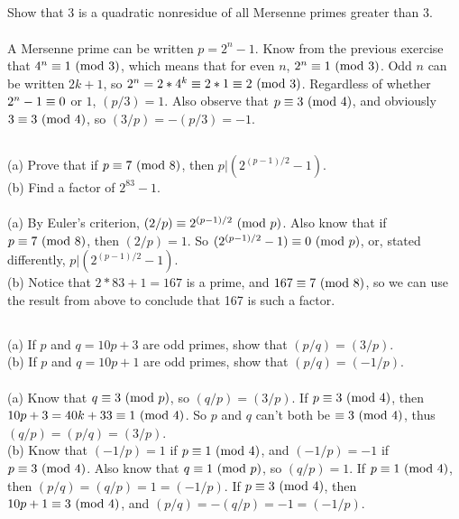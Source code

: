 \documentclass{article} \usepackage{amsmath}
\begin{document}
\subsection{}
Show that 3 is a quadratic nonresidue of all Mersenne primes greater than 3.\\~\\
A Mersenne prime can be written $p = 2^n - 1$.
Know from the previous exercise that $4^n \equiv 1 \ (\mathrm{mod}\ 3)$, which means that
for even $n$, $2^n \equiv 1 \ (\mathrm{mod}\ 3)$.
Odd $n$ can be written $2k + 1$, so $2^n = 2*4^k \equiv 2*1 \equiv 2 \ (\mathrm{mod}\ 3)$.
Regardless of whether $2^n - 1 \equiv 0$ or $1$, $(p/3) = 1$.
Also observe that $p \equiv 3 \ (\mathrm{mod}\ 4)$, and obviously $3 \equiv 3 \ (\mathrm{mod}\ 4)$,
so $(3/p) = -(p/3) = -1$.

\subsection{}
(a) Prove that if $p \equiv 7 \ (\mathrm{mod}\ 8)$, then $p|(2^{(p-1)/2} - 1)$.\\
(b) Find a factor of $2^{83} - 1$.\\~\\
(a) By Euler's criterion, $(2/p) \equiv 2^{(p-1)/2} \ (\mathrm{mod}\ p)$.
Also know that if $p \equiv 7 \ (\mathrm{mod}\ 8)$, then $(2/p) = 1$.
So $(2^{(p-1)/2} - 1) \equiv 0 \ (\mathrm{mod}\ p)$, or, stated differently,
$p|(2^{(p-1)/2} - 1)$.\\
(b) Notice that $2 * 83 + 1 = 167$ is a prime, and $167 \equiv 7 \ (\mathrm{mod}\ 8)$,
so we can use the result from above to conclude that 167 is such a factor.

\subsection{}
(a) If $p$ and $q = 10p + 3$ are odd primes, show that $(p/q) = (3/p)$.\\
(b) If $p$ and $q = 10p + 1$ are odd primes, show that $(p/q) = (-1/p)$.\\~\\
(a) Know that $q \equiv 3 \ (\mathrm{mod}\ p)$, so $(q/p) = (3/p)$.
If $p \equiv 3 \ (\mathrm{mod}\ 4)$, then $10p + 3 = 40k + 33 \equiv 1 \ (\mathrm{mod}\ 4)$.
So $p$ and $q$ can't both be $\equiv 3 \ (\mathrm{mod}\ 4)$, thus $(q/p) = (p/q) = (3/p)$.\\
(b) Know that $(-1/p) = 1$ if $p \equiv 1 \ (\mathrm{mod}\ 4)$, and $(-1/p) = -1$ if $p \equiv 3 \ (\mathrm{mod}\ 4)$.
Also know that $q \equiv 1 \ (\mathrm{mod}\ p)$, so $(q/p) = 1$.
If $p \equiv 1 \ (\mathrm{mod}\ 4)$, then $(p/q) = (q/p) = 1 = (-1/p)$.
If $p \equiv 3 \ (\mathrm{mod}\ 4)$, then $10p + 1 \equiv 3 \ (\mathrm{mod}\ 4)$, and $(p/q) = -(q/p) = -1 = (-1/p)$.

\end{document}
